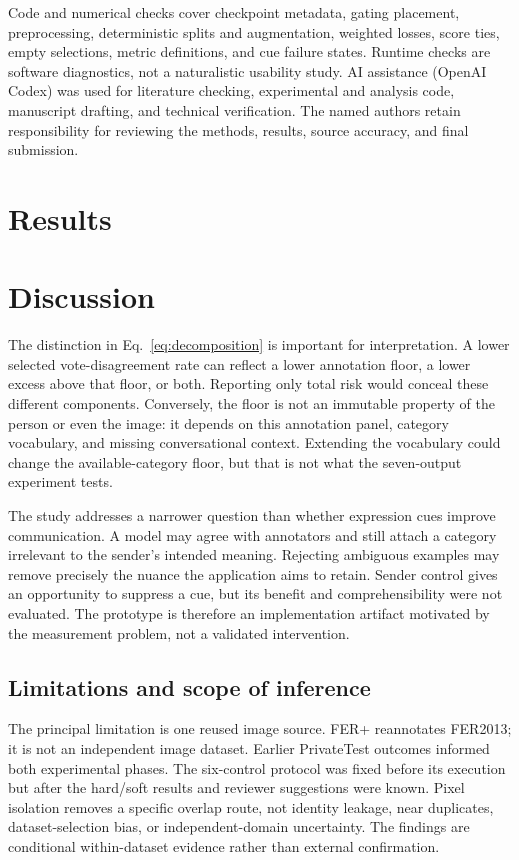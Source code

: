 \documentclass[pdflatex,sn-mathphys-num]{sn-jnl}
\begin{document}
Code and numerical checks cover checkpoint metadata, gating placement, preprocessing, deterministic splits and augmentation, weighted losses, score ties, empty selections, metric definitions, and cue failure states. Runtime checks are software diagnostics, not a naturalistic usability study. AI assistance (OpenAI Codex) was used for literature checking, experimental and analysis code, manuscript drafting, and technical verification. The named authors retain responsibility for reviewing the methods, results, source accuracy, and final submission.

\section{Results}


\section{Discussion}


The distinction in Eq.~\ref{eq:decomposition} is important for interpretation. A lower selected vote-disagreement rate can reflect a lower annotation floor, a lower excess above that floor, or both. Reporting only total risk would conceal these different components. Conversely, the floor is not an immutable property of the person or even the image: it depends on this annotation panel, category vocabulary, and missing conversational context. Extending the vocabulary could change the available-category floor, but that is not what the seven-output experiment tests.

The study addresses a narrower question than whether expression cues improve communication. A model may agree with annotators and still attach a category irrelevant to the sender's intended meaning. Rejecting ambiguous examples may remove precisely the nuance the application aims to retain. Sender control gives an opportunity to suppress a cue, but its benefit and comprehensibility were not evaluated. The prototype is therefore an implementation artifact motivated by the measurement problem, not a validated intervention.

\subsection{Limitations and scope of inference}
The principal limitation is one reused image source. FER+ reannotates FER2013; it is not an independent image dataset. Earlier PrivateTest outcomes informed both experimental phases. The six-control protocol was fixed before its execution but after the hard/soft results and reviewer suggestions were known. Pixel isolation removes a specific overlap route, not identity leakage, near duplicates, dataset-selection bias, or independent-domain uncertainty. The findings are conditional within-dataset evidence rather than external confirmation.
\end{document}
